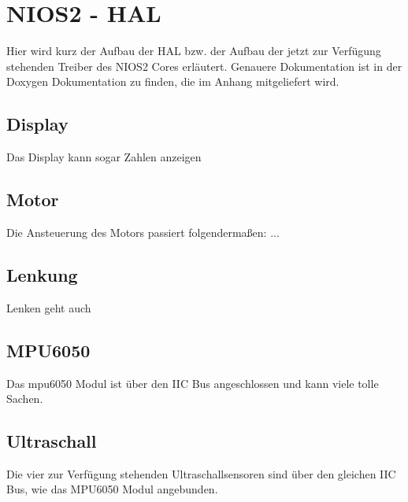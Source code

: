 \chapter{NIOS2 - HAL}
Hier wird kurz der Aufbau der HAL bzw. der Aufbau der jetzt zur Verfügung stehenden Treiber des NIOS2 Cores erläutert. Genauere Dokumentation ist in der Doxygen Dokumentation zu finden, die im Anhang mitgeliefert wird. 
\section{Display}
Das Display kann sogar Zahlen anzeigen
\section{Motor}
Die Ansteuerung des Motors passiert folgendermaßen: ...
\section{Lenkung}
Lenken geht auch
\section{MPU6050}
Das mpu6050 Modul ist über den IIC Bus angeschlossen und kann viele tolle Sachen.
\section{Ultraschall}
Die vier zur Verfügung stehenden Ultraschallsensoren sind über den gleichen IIC Bus, wie das MPU6050 Modul angebunden. 

